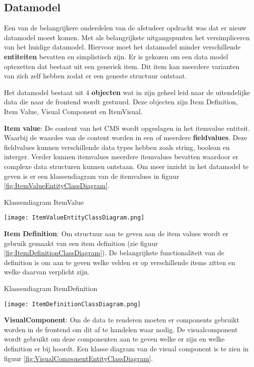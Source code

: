 \subsection{Datamodel}
Een van de belangrijkere onderdelen van de afstudeer opdracht was dat er nieuw datamodel moest komen.
Met als belangrijkste uitgangspunten het versimpliceren van het huidige datamodel.
Hiervoor moet het datamodel minder verschillende \textbf{entiteiten} bevatten en simplistisch zijn.
Er is gekozen om een data model optezetten dat bestaat uit een generiek item.
Dit item kan meerdere varianten van zich zelf hebben zodat er een geneste structuur ontstaat.

\whitespace
Het datamodel bestaat uit 4 \textbf{objecten} wat in zijn geheel leid naar de uitendelijke data die naar de frontend wordt gestuurd.
Deze objecten zijn Item Definition, Item Value, Visual Component en ItemVisual.

\whitespace[2]
\textbf{Item value}: De content van het CMS wordt opgeslagen in het itemvalue entiteit.
Waarbij de waardes van de content worden in een of meerdere \textbf{fieldvalues}.
Deze fieldvalues kunnen verschillende data types hebben zoals string, boolean en interger.
Verder kunnen itemvalues meerdere itemvalues bevatten waardoor er complexe data structuren kunnen ontstaan.
Om meer inzicht in het datamodel te geven is er een klassendiagram van de itemvalues in figuur \ref{fig:ItemValueEntityClassDiagram}.

\whitespace[2]
\begin{graphic}
    \captionsetup{type=figure}
    \caption{Klassendiagram ItemValue}
    \texttt{[image: ItemValueEntityClassDiagram.png]}
    \label{fig:ItemValueEntityClassDiagram}
\end{graphic}

\whitespace[2]
\textbf{Item Definition}: Om structuur aan te geven aan de item values wordt er gebruik gemaakt van een item definition (zie figuur \ref{fig:ItemDefinitionClassDiagram}).
De belangrijkste functionaliteit van de definition is om aan te geven welke velden er op verschillende items zitten en welke daarvan verplicht zijn.

\whitespace[2]
\begin{graphic}
    \captionsetup{type=figure}
    \caption{Klassendiagram  ItemDefinition}
    \texttt{[image: ItemDefinitionClassDiagram.png]}
    \label{fig:ItemDefinitionClassDiagram}
\end{graphic}

\whitespace
\textbf{VisualComponent}: Om de data te renderen moeten er components gebruikt worden in de frontend om dit af te handelen waar nodig.
De visualcomponent wordt gebruikt om deze componenten aan te geven welke er zijn en welke definition er bij hoordt.
Een klasse diagram van de visual component is te zien in figuur \ref{fig:VisualComponentEntityClassDiagram}.

